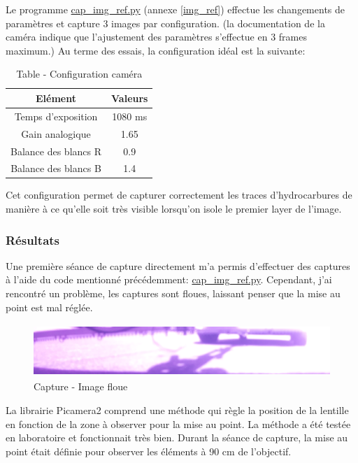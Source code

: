 Le programme \underline{cap\_img\_ref.py} (annexe \ref{img_ref}) effectue les changements de paramètres et capture 3 images par configuration.
(la documentation de la caméra indique que l'ajustement des paramètres s'effectue en 3 frames maximum.)
Au terme des essais, la configuration idéal est la suivante:

\begin{table}[H]
    \begin{center}
        \caption{Table - Configuration caméra}
        \begin{tabular}{|c|c|}
            Elément              & Valeurs                 \\ \hline
            Temps d'exposition   & 1080 \si{\milli\second} \\
            Gain analogique      & 1.65                    \\
            Balance des blancs R & 0.9                     \\
            Balance des blancs B & 1.4                     \\
        \end{tabular}
    \end{center}
\end{table}

Cet configuration permet de capturer correctement les traces d'hydrocarbures de manière à ce qu'elle soit très visible lorsqu'on isole le premier layer de l'image.
\subsubsection{Résultats}
Une première séance de capture directement m'a permis d'effectuer des captures à l'aide du code mentionné précédemment: \underline{cap\_img\_ref.py}. Cependant, j'ai rencontré un problème, les captures sont floues, laissant penser que la mise au point est mal réglée.

\begin{figure}[H]
    \centering
    \includegraphics[height=2cm]{assets/figures/capture_floue.png}
    \caption{Capture - Image floue}
\end{figure}

La librairie Picamera2 \cite{picamera2} comprend une méthode qui règle la position de la lentille en fonction de la zone à observer pour la mise au point. La méthode a été testée en laboratoire et fonctionnait très bien. Durant la séance de capture,
la mise au point était définie pour observer les éléments à 90 \si{\centi\meter} de l'objectif.

